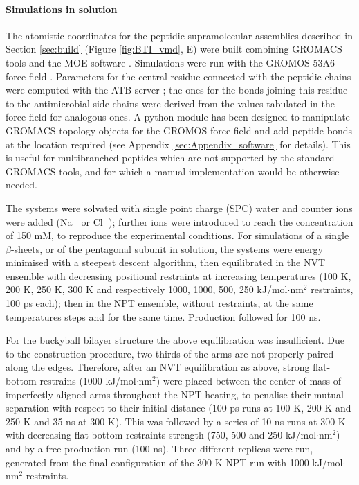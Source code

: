 \paragraph{Simulations in solution} The atomistic coordinates for the peptidic supramolecular assemblies described in Section \ref{sec:build} (Figure \ref{fig:BTI_vmd}, E) were built combining GROMACS tools and the MOE software \citep{moe}.
%
Simulations were run with the GROMOS 53A6 force field \citep{Oostenbrink2004}. Parameters for the central residue connected with the peptidic chains were computed with the ATB server \citep{Malde2011, Koziara2014}; the ones for the bonds joining this residue to the antimicrobial side chains were derived from the values tabulated in the force field for analogous ones.
%
A python module has been designed to manipulate GROMACS topology objects for the GROMOS force field and add peptide bonds at the location required (see Appendix \ref{sec:Appendix_software} for details). This is useful for multibranched peptides which are not supported by the standard GROMACS tools, and for which a manual implementation would be otherwise needed.

The systems were solvated with single point charge (SPC) water \citep{Berendsen1981} and counter ions were added (Na$^+$ or Cl$^-$); further ions were introduced to reach the concentration of 150 mM, to reproduce the experimental conditions.
%
For simulations of a single $\beta$-sheets, or of the pentagonal subunit in solution, the systems were energy minimised with a steepest descent algorithm, then equilibrated in the NVT ensemble with decreasing positional restraints at increasing temperatures (100 K, 200 K, 250 K, 300 K and respectively 1000, 1000, 500, 250 kJ/mol$\cdot$nm$^2$ restraints, 100 ps each); then in the NPT ensemble, without restraints, at the same temperatures steps and for the same time. Production followed for 100 ns.

For the buckyball bilayer structure the above equilibration was insufficient. Due to the construction procedure, two thirds of the arms are not properly paired along the edges.
%
Therefore, after an NVT equilibration as above, strong flat-bottom restrains (1000 kJ/mol$\cdot$nm$^2$) were placed between the center of mass of imperfectly aligned arms throughout the NPT heating, to penalise their mutual separation with respect to their initial distance (100 ps runs at 100 K, 200 K and 250 K and 35 ns at 300 K).
%
This was followed by a series of 10 ns runs at 300 K with decreasing flat-bottom restraints strength (750, 500 and 250 kJ/mol$\cdot$nm$^2$) and by a free production run (100 ns).
%
Three different replicas were run, generated from the final configuration of the 300 K NPT run with 1000 kJ/mol$\cdot$nm$^2$ restraints.

